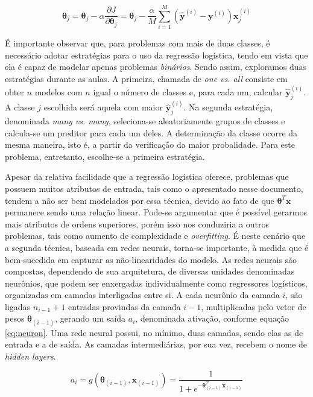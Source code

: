 \documentclass[10pt,twocolumn,letterpaper]{article}
\begin{document}
\begin{equation}
\label {gd}
\bm{\theta}_j = \bm{\theta}_j - \alpha\frac{\partial J}{\partial \bm{\theta}_j } = \bm{\theta}_j - \frac{\alpha}{M} \displaystyle\sum_{i=1}^{M} \left(\bm{\hat{y}}^{(i)} - \bm{y}^{(i)}\right)\bm{x}_j^{(i)}
\end{equation}

É importante observar que, para problemas com mais de duas classes, é necessário adotar estratégias para o uso da regressão logística, tendo em vista que ela é capaz de modelar apenas problemas \textit {binários}. Sendo assim, exploramos duas estratégias durante as aulas. A primeira, chamada de \textit{one vs. all} consiste em obter \(n\) modelos com \(n\) igual o número de classes e, para cada um, calcular \(\bm{\hat{y}}^{(i)}_j\). A classe \(j\) escolhida será aquela com maior \(\bm{\hat{y}}^{(i)}_j\). Na segunda estratégia, denominada \textit{many vs. many}, seleciona-se aleatoriamente grupos de classes e calcula-se um preditor para cada um deles. A determinação da classe ocorre da mesma maneira, isto é, a partir da verificação da maior probalidade. Para este problema, entretanto, escolhe-se a primeira estratégia.

Apesar da relativa facilidade que a regressão logística oferece, problemas que possuem muitos atributos de entrada, tais como o apresentado nesse documento, tendem a não ser bem modelados por essa técnica, devido ao fato de que \(\bm{\theta}^T\bm{x}\) permanece sendo uma relação linear. Pode-se argumentar que é possível gerarmos mais atributos de ordens superiores, porém isso nos conduziria a outros problemas, tais como aumento de complexidade e \textit{overfitting}. É neste cenário que a segunda técnica, baseada em redes neurais, torna-se importante, à medida que é bem-sucedida em capturar as não-linearidades do modelo. As redes neurais são compostas, dependendo de sua arquitetura, de diversas unidades denominadas neurônios, que podem ser enxergadas individualmente como regressores logísticos, organizadas em camadas interligadas entre si. A cada neurônio da camada \(i\), são ligadas \(n_{i-1} + 1\) entradas provindas da camada \(i-1\), multiplicadas pelo vetor de pesos \(\bm{\theta}_{(i-1)}\), gerando um saída \(a_i\), denominada ativação, conforme equação \ref{eq:neuron}. Uma rede neural possui, no mínimo, duas camadas, sendo elas as de entrada e a de saída. As camadas intermediárias, por sua vez, recebem o nome de \textit{hidden layers}.

\begin{equation}
\label {eq:neuron}
a_{i} = g \left(\bm{\theta}_{(i-1)},\bm{x}_{(i-1)}\right) = \frac {1}{1 + e^{-\bm{\theta}_{(i-1)}^T\bm{x}_{(i-1)}}}
\end{equation}
\end{document}
